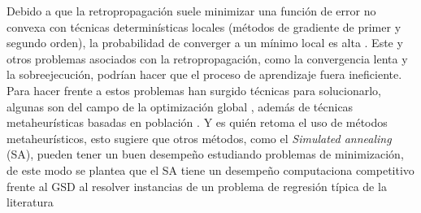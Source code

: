 Debido a que la retropropagación suele minimizar una función de error no convexa con técnicas determinísticas locales (métodos de gradiente de primer y segundo orden), la probabilidad de converger a un mínimo local es alta \cite{Bianchini1996, Bishop1995, Battiti1995}. Este y otros problemas asociados con la retropropagación, como la convergencia lenta y la sobreejecución, podrían hacer que el proceso de aprendizaje fuera ineficiente. Para hacer frente a estos problemas han surgido técnicas para solucionarlo, algunas son del campo de la optimización global \cite{Battiti1995, Tsai2006, Rocha2003, Chelouah2000, Zheng2005}, además de técnicas metaheurísticas basadas en población \cite{Lamos2012}. Y es  quién retoma el uso de métodos metaheurísticos, esto sugiere que otros métodos, como el {\em Simulated annealing} (SA), pueden tener un buen desempeño estudiando problemas de minimización, de este modo se plantea que el SA tiene un desempeño computaciona competitivo frente al GSD al resolver instancias de un problema de regresión típica de la literatura



















